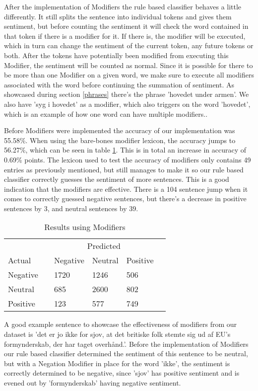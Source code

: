 After the implementation of Modifiers the rule based classifier behaves a little differently. It still splits the sentence into individual tokens and gives them sentiment, but before counting the sentiment it will check the word contained in that token if there is a modifier for it. If there is, the modifier will be executed, which in turn can change the sentiment of the current token, any future tokens or both. After the tokens have potentially been modified from executing this Modifier, the sentiment will be counted as normal. Since it is possible for there to be more than one Modifier on a given word, we make sure to execute all modifiers associated with the word before continuing the summation of sentiment. As showcased during section \ref{phrases} there's the phrase 'hovedet under armen'. We also have 'syg i hovedet' as a modifier, which also triggers on the word 'hovedet', which is an example of how one word can have multiple modifiers..

Before Modifiers were implemented the accuracy of our implementation was 55.58\%. When using the bare-bones modifier lexicon, the accuracy jumps to 56.27\%, which can be seen in table \ref{rbresults}. This is in total an increase in accuracy of 0.69\% points. The lexicon used to test the accuracy of modifiers only contains 49 entries as previously mentioned, but still manages to make it so our rule based classifier correctly guesses the sentiment of more sentences. This is a good indication that the modifiers are effective. There is a 104 sentence jump when it comes to correctly guessed negative sentences, but there's a decrease in positive sentences by 3, and neutral sentences by 39.  
\begin{table}[H]
	\begin{tabular}{@{}llllll@{}}
		\toprule
		& & \multicolumn{3}{c}{Predicted} \\\cmidrule{3-5}
		Actual & & Negative & Neutral & Positive &  \\ \midrule
		Negative & & 1720 & 1246 & 506 & \\
		Neutral  & & 685 & 2600 & 802 & \\
		Positive & & 123 & 577 & 749 & \\ \bottomrule
	\end{tabular}
	\centering
	\caption{Results using Modifiers}
	\label{rbresults}
\end{table}
A good example sentence to showcase the effectiveness of modifiers from our dataset is 'det er jo ikke for sjov, at det britiske folk stemte sig ud af EU's formynderskab, der har taget overhånd.'. Before the implementation of Modifiers our rule based classifier determined the sentiment of this sentence to be neutral, but with a Negation Modifier in place for the word 'ikke', the sentiment is correctly determined to be negative, since 'sjov' has positive sentiment and is evened out by 'formynderskab' having negative sentiment.


